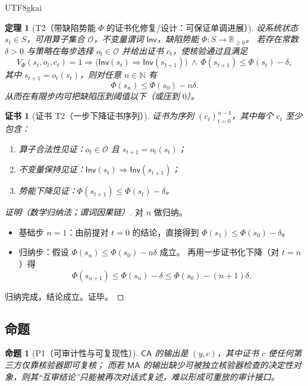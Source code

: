 \documentclass[12pt]{article}
\newtheorem{theorem}{定理}[section]
\newtheorem{proposition}{命题}[section]
\newtheorem{Certificate}{证书}[section]
\newcommand{\RR}{\mathbb{R}}
\newcommand{\NN}{\mathbb{N}}
\begin{document}
\begin{CJK*}{UTF8}{gkai}
\begin{theorem}[T2（带缺陷势能 $\Phi$ 的证书化修复/设计：可保证单调进展）]
\label{thm:tex27-ch17-t2}
设系统状态 $s_t\in S$，可用算子集合 $\mathcal{O}$，不变量谓词 $\mathsf{Inv}$，缺陷势能 $\Phi:S\to\RR_{\ge 0}$。
若存在常数 $\delta>0$ 与策略在每步选择 $o_t\in\mathcal{O}$ 并给出证书 $c_t$，使核验通过且满足
\[
  V_\Phi(s_t,o_t,c_t)=1\Rightarrow
  \Big(\mathsf{Inv}(s_t)\Rightarrow \mathsf{Inv}(s_{t+1})\Big)\ \wedge\ \Phi(s_{t+1})\le \Phi(s_t)-\delta,
\]
其中 $s_{t+1}=o_t(s_t)$，则对任意 $n\in\NN$ 有
\[
  \Phi(s_n)\le \Phi(s_0)-n\delta.
\]
从而在有限步内可把缺陷压到阈值以下（或压到 $0$）。
\end{theorem}

\begin{Certificate}[证书 T2（一步下降证书序列）]
\label{cert:tex27-ch17-t2}
证书为序列 $(c_t)_{t=0}^{n-1}$，其中每个 $c_t$ 至少包含：
\begin{enumerate}
  \item 算子合法性见证：$o_t\in\mathcal{O}$ 且 $s_{t+1}=o_t(s_t)$；
  \item 不变量保持见证：$\mathsf{Inv}(s_t)\Rightarrow \mathsf{Inv}(s_{t+1})$；
  \item 势能下降见证：$\Phi(s_{t+1})\le \Phi(s_t)-\delta$。
\end{enumerate}
\end{Certificate}

\begin{proof}[证明（数学归纳法；谓词因果链）]
对 $n$ 做归纳。
\begin{itemize}
  \item 基础步 $n=1$：由前提对 $t=0$ 的结论，直接得到 $\Phi(s_1)\le \Phi(s_0)-\delta$。
  \item 归纳步：假设 $\Phi(s_n)\le \Phi(s_0)-n\delta$ 成立。
  再用一步证书化下降（对 $t=n$）得
  \[
    \Phi(s_{n+1})\le \Phi(s_n)-\delta\le \Phi(s_0)-(n+1)\delta.
  \]
\end{itemize}
归纳完成，结论成立。证毕。
\end{proof}

\subsection{命题}
\label{subsec:tex27-ch17-propositions}

\begin{proposition}[P1（可审计性与可复现性）]
\label{prop:tex27-ch17-p1}
$\mathsf{CA}$ 的输出是 $(y,c)$，其中证书 $c$ 使任何第三方仅靠核验器即可复核；
而若 $\mathsf{MA}$ 的输出缺少可被独立核验器检查的决定性对象，则其“互审结论”只能被再次对话式复述，难以形成可重放的审计接口。
\end{proposition}


\end{CJK*}
\end{document}
